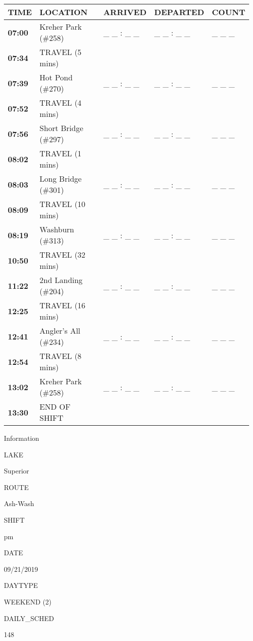 \documentclass[]{article}
\begin{document}
\begin{tabular}{>{\bfseries}lllll}
\toprule
\textbf{TIME} & \textbf{LOCATION} & \textbf{ARRIVED} & \textbf{DEPARTED} & \textbf{COUNT}\\
\midrule
07:00 & Kreher Park (\#258) & \_ \_ : \_ \_ & \_ \_ : \_ \_ & \_ \_ \_\\
07:34 & TRAVEL (5 mins) &  &  & \\
07:39 & Hot Pond (\#270) & \_ \_ : \_ \_ & \_ \_ : \_ \_ & \_ \_ \_\\
07:52 & TRAVEL (4 mins) &  &  & \\
07:56 & Short Bridge (\#297) & \_ \_ : \_ \_ & \_ \_ : \_ \_ & \_ \_ \_\\
08:02 & TRAVEL (1 mins) &  &  & \\
08:03 & Long Bridge (\#301) & \_ \_ : \_ \_ & \_ \_ : \_ \_ & \_ \_ \_\\
08:09 & TRAVEL (10 mins) &  &  & \\
08:19 & Washburn (\#313) & \_ \_ : \_ \_ & \_ \_ : \_ \_ & \_ \_ \_\\
10:50 & TRAVEL (32 mins) &  &  & \\
11:22 & 2nd Landing (\#204) & \_ \_ : \_ \_ & \_ \_ : \_ \_ & \_ \_ \_\\
12:25 & TRAVEL (16 mins) &  &  & \\
12:41 & Angler's All (\#234) & \_ \_ : \_ \_ & \_ \_ : \_ \_ & \_ \_ \_\\
12:54 & TRAVEL (8 mins) &  &  & \\
13:02 & Kreher Park (\#258) & \_ \_ : \_ \_ & \_ \_ : \_ \_ & \_ \_ \_\\
13:30 & END OF SHIFT &  &  & \\
\bottomrule
\end{tabular}\newpage

Information

LAKE

Superior

ROUTE

Ash-Wash

SHIFT

pm

DATE

09/21/2019

DAYTYPE

WEEKEND (2)

DAILY\_SCHED

148

\vspace{24pt}
\end{document}
